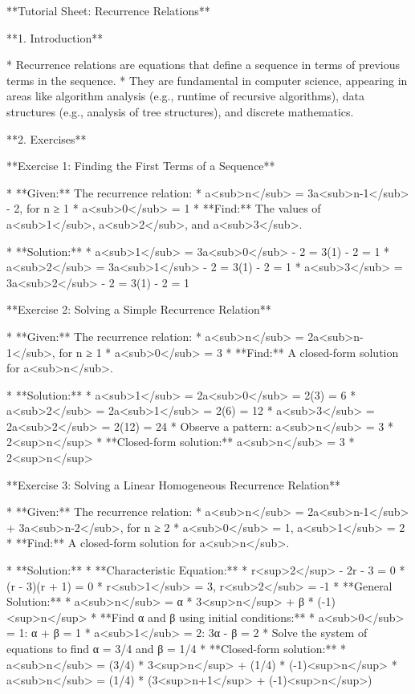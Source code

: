 **Tutorial Sheet: Recurrence Relations**

**1. Introduction**

*   Recurrence relations are equations that define a sequence in terms of previous terms in the sequence. 
*   They are fundamental in computer science, appearing in areas like algorithm analysis (e.g., runtime of recursive algorithms), data structures (e.g., analysis of tree structures), and discrete mathematics.

**2. Exercises**

**Exercise 1: Finding the First Terms of a Sequence**

*   **Given:** The recurrence relation: 
      *   a<sub>n</sub> = 3a<sub>n-1</sub> - 2, for n ≥ 1
      *   a<sub>0</sub> = 1
*   **Find:** The values of a<sub>1</sub>, a<sub>2</sub>, and a<sub>3</sub>.

*   **Solution:**    *   a<sub>1</sub> = 3a<sub>0</sub> - 2 = 3(1) - 2 = 1
    *   a<sub>2</sub> = 3a<sub>1</sub> - 2 = 3(1) - 2 = 1
    *   a<sub>3</sub> = 3a<sub>2</sub> - 2 = 3(1) - 2 = 1

**Exercise 2: Solving a Simple Recurrence Relation**

*   **Given:** The recurrence relation:
      *   a<sub>n</sub> = 2a<sub>n-1</sub>, for n ≥ 1
      *   a<sub>0</sub> = 3
*   **Find:** A closed-form solution for a<sub>n</sub>.

*   **Solution:**
    *   a<sub>1</sub> = 2a<sub>0</sub> = 2(3) = 6
    *   a<sub>2</sub> = 2a<sub>1</sub> = 2(6) = 12
    *   a<sub>3</sub> = 2a<sub>2</sub> = 2(12) = 24
    *   Observe a pattern: a<sub>n</sub> = 3 * 2<sup>n</sup>
    *   **Closed-form solution:** a<sub>n</sub> = 3 * 2<sup>n</sup>

**Exercise 3: Solving a Linear Homogeneous Recurrence Relation**

*   **Given:** The recurrence relation:
      *   a<sub>n</sub> = 2a<sub>n-1</sub> + 3a<sub>n-2</sub>, for n ≥ 2
      *   a<sub>0</sub> = 1, a<sub>1</sub> = 2
*   **Find:** A closed-form solution for a<sub>n</sub>.

*   **Solution:**
    *   **Characteristic Equation:** 
        *   r<sup>2</sup> - 2r - 3 = 0 
        *   (r - 3)(r + 1) = 0 
        *   r<sub>1</sub> = 3, r<sub>2</sub> = -1
    *   **General Solution:** 
        *   a<sub>n</sub> = α * 3<sup>n</sup> + β * (-1)<sup>n</sup> 
    *   **Find α and β using initial conditions:**
        *   a<sub>0</sub> = 1: α + β = 1
        *   a<sub>1</sub> = 2: 3α - β = 2
        *   Solve the system of equations to find α = 3/4 and β = 1/4
    *   **Closed-form solution:** 
        *   a<sub>n</sub> = (3/4) * 3<sup>n</sup> + (1/4) * (-1)<sup>n</sup> 
        *   a<sub>n</sub> = (1/4) * (3<sup>n+1</sup> + (-1)<sup>n</sup>)

